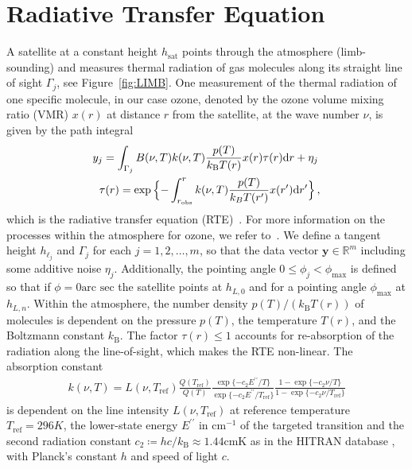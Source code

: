 \section{Radiative Transfer Equation}
\label{sec:RTE}
A satellite at a constant height $h_{\text{sat}}$ points through the atmosphere (limb-sounding) and measures thermal radiation of gas molecules along its straight line of sight $\Gamma_j$, see  Figure~\ref{fig:LIMB}.
One measurement of the thermal radiation of one specific molecule, in our case ozone, denoted by the ozone volume mixing ratio (VMR) $x(r)$ at distance $r$ from the satellite, at the wave number $\nu$, is given by the path integral
\begin{align}
	\label{eq:RTE} 
	y_j =   \int_{\Gamma_j}  B(\nu,T) k(\nu, T)   \frac{p(T)}{k_{\text{B}} T(r)}  x(r)  \tau(r) \text{d}r + \eta_j \, \\
	\tau(r) = \exp{ \Bigl\{ - \int^{r}_{r_\text{obs}}  k(\nu, T)   \frac{p(T)}{k_B T(r^{\prime})}  x(r^{\prime}) \text{d}r^{\prime} \Bigr\} } \, ,\label{eq:absRTE} 
\end{align}
which is the radiative transfer equation (RTE)~\cite{mipas2000handbook}.
For more information on the processes within the atmosphere for ozone, we refer to~\cite{Lee2020NightOzone}.
We define a tangent height $h_{\ell_j}$ and $\Gamma_j$ for each $j=1,2,\ldots,m$, so that the data vector $\bm{y} \in \mathbb{R}^m$ including some additive noise $\eta_j$.
Additionally, the pointing angle $0 \leq \phi_j < \phi_{\text{max}}$ is defined so that if $\phi = 0 \text{arc sec}$ the satellite points at $h_{L,0}$ and for a pointing angle $\phi_{\text{max}}$ at $h_{L,n}$.
Within the atmosphere, the number density $p(T) / (k_{\text{B}} T(r))$ of molecules is dependent on the pressure $p(T)$, the temperature $T(r)$, and the Boltzmann constant $k_{\text{B}}$.
The factor $\tau(r)\leq 1$ accounts for re-absorption of the radiation along the line-of-sight, which makes the RTE non-linear.
The absorption constant
\begin{align}
	k(\nu, T) = L(\nu, T_{\text{ref}}) \frac{Q(T_{\text{ref}})}{Q(T)} \frac{ \exp{\{ - c_2 E^{\prime \prime} / T\}} }{\exp{\{ - c_2 E^{\prime \prime} / T_{\text{ref}} \}}} \frac{ 1- \exp{\{ - c_2 \nu  / T \}} }{1 - \exp{\{ - c_2 \nu / T_{\text{ref}} \}}}
\end{align}
is dependent on the line intensity $L(\nu, T_{\text{ref}})$ at reference temperature $T_{\text{ref}} =296K $, the lower-state energy $ E^{\prime \prime} $ in $\text{cm}^{-1}$ of the targeted transition and the second radiation constant $c_2\coloneqq hc/k_{\text{B}} \approx 1.44\text{cmK}$ as in the HITRAN database \cite{gordon2022hitran2020}, with Planck's constant $h$ and speed of light $c$.
